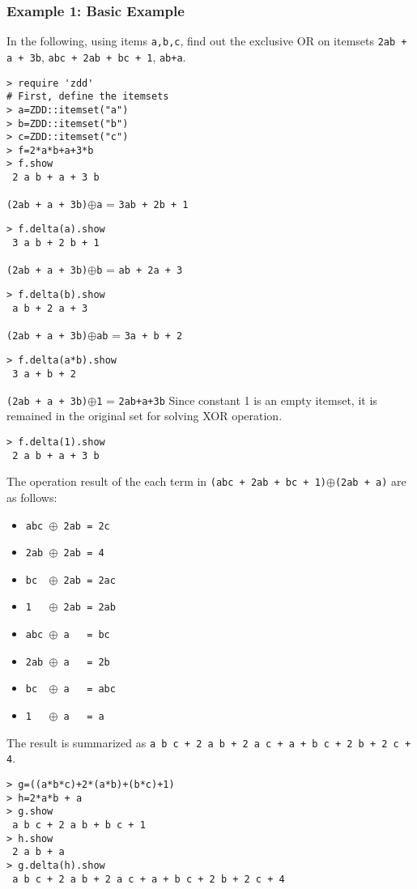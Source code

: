 \subsubsection*{Example 1: Basic Example}

In the following, using items \verb|a,b,c|, find out the exclusive OR on itemsets
\verb|2ab + a + 3b|, \verb|abc + 2ab + bc + 1|, \verb|ab+a|.


\begin{Verbatim}[baselinestretch=0.7,frame=single]
> require 'zdd'
# First, define the itemsets
> a=ZDD::itemset("a")
> b=ZDD::itemset("b")
> c=ZDD::itemset("c")
> f=2*a*b+a+3*b
> f.show
 2 a b + a + 3 b
\end{Verbatim}

 \verb|(2ab + a + 3b)|$\oplus$\verb|a| = \verb|3ab + 2b + 1|
\begin{Verbatim}[baselinestretch=0.7,frame=single]
> f.delta(a).show
 3 a b + 2 b + 1
\end{Verbatim}

 \verb|(2ab + a + 3b)|$\oplus$\verb|b| = \verb|ab + 2a + 3|
\begin{Verbatim}[baselinestretch=0.7,frame=single]
> f.delta(b).show
 a b + 2 a + 3
\end{Verbatim}

 \verb|(2ab + a + 3b)|$\oplus$\verb|ab| = \verb|3a + b + 2|
\begin{Verbatim}[baselinestretch=0.7,frame=single]
> f.delta(a*b).show
 3 a + b + 2
\end{Verbatim}

 \verb|(2ab + a + 3b)|$\oplus$\verb|1| = \verb|2ab+a+3b|
 Since constant 1 is an empty itemset, it is remained in the original set for solving XOR operation.
\begin{Verbatim}[baselinestretch=0.7,frame=single]
> f.delta(1).show
 2 a b + a + 3 b
\end{Verbatim}

 The operation result of the each term in \verb|(abc + 2ab + bc + 1)|$\oplus$\verb|(2ab + a)|
 are as follows:
 \begin{itemize}
 \item \verb|abc |$\oplus$\verb| 2ab = 2c|
 \item \verb|2ab |$\oplus$\verb| 2ab = 4|
 \item \verb|bc  |$\oplus$\verb| 2ab = 2ac|
 \item \verb|1   |$\oplus$\verb| 2ab = 2ab|
 \item \verb|abc |$\oplus$\verb| a   = bc|
 \item \verb|2ab |$\oplus$\verb| a   = 2b|
 \item \verb|bc  |$\oplus$\verb| a   = abc|
 \item \verb|1   |$\oplus$\verb| a   = a|
 \end{itemize}
 
 The result is summarized as \verb|a b c + 2 a b + 2 a c + a + b c + 2 b + 2 c + 4|.
\begin{Verbatim}[baselinestretch=0.7,frame=single]
> g=((a*b*c)+2*(a*b)+(b*c)+1)
> h=2*a*b + a
> g.show
 a b c + 2 a b + b c + 1
> h.show
 2 a b + a
> g.delta(h).show
 a b c + 2 a b + 2 a c + a + b c + 2 b + 2 c + 4
\end{Verbatim}
